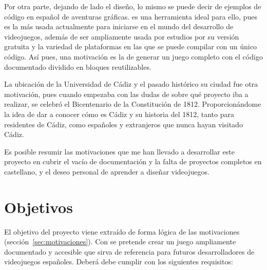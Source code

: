 Por otra parte, dejando de lado el diseño, lo mismo se puede decir de ejemplos de código en español de aventuras gráficas.  es una herramienta ideal para ello, pues es la más usada actualmente para iniciarse en el mundo del desarrollo de videojuegos, además de ser ampliamente usada por estudios por su versión gratuita y la variedad de plataformas en las que se puede compilar con un único código. Así pues, una motivación es la de generar un juego completo con el código documentado dividido en bloques reutilizables.

La ubicación de la Universidad de Cádiz y el pasado histórico su ciudad fue otra motivación, pues cuando empezaba con las dudas de sobre qué proyecto iba a realizar, se celebró el Bicentenario de la Constitución de 1812. Proporcionándome la idea de dar a conocer cómo es Cádiz y su historia del 1812, tanto para residentes de Cádiz, como españoles y extranjeros que nunca hayan visitado Cádiz.

Es posible resumir las motivaciones que me han llevado a desarrollar este proyecto en cubrir el vacío de documentación y la falta de proyectos completos en castellano, y el deseo personal de aprender a diseñar videojuegos.

\section{Objetivos}
\label{sec:objetivos}
El objetivo del proyecto viene extraído de forma lógica de las motivaciones (sección~\ref{sec:motivaciones}). Con \nombrejuego se pretende crear un juego ampliamente documentado y accesible que sirva de referencia para futuros desarrolladores de videojuegos españoles. Deberá debe cumplir con los siguientes requisitos:

